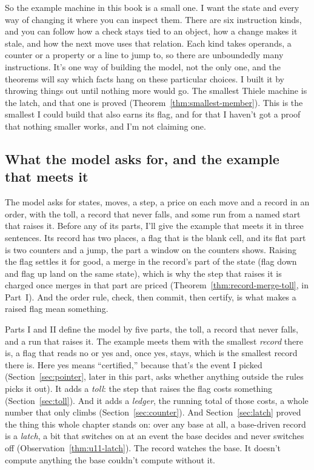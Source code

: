 \documentclass[11pt,twoside]{article}
\theoremstyle{thielethm}
\theoremstyle{thieledef}
\theoremstyle{thieledef}
\theoremstyle{thieledef}
\theoremstyle{thielethm}
\theoremstyle{thieleobs}
\theoremstyle{thielethm}
\begin{document}
So the example machine in this book is a small one. I want the state and every way of
changing it where you can inspect them. There are six instruction kinds, and you can follow how
a check stays tied to an object, how a change makes it stale, and how the next move
uses that relation. Each kind takes operands, a counter or a property or a line to
jump to, so there are unboundedly many instructions. It's one way of building the
model, not the only one, and the theorems will say which facts hang on these particular choices.
I built it by throwing things out until nothing more would go. The smallest Thiele machine is
the latch, and that one is proved (Theorem~\ref{thm:smallest-member}). This is the smallest I could
build that also earns its flag, and for that I haven't got a proof that nothing smaller works, and
I'm not claiming one.

\subsection{What the model asks for, and the example that meets it}

The model asks for states, moves, a step, a price on each move and a record in an order, with the
toll, a record that never falls, and some run from a named start that raises it. Before any of its parts, I'll give the example that meets it in three sentences. Its record has two places, a flag that is the blank cell, and its flat part is two
counters and a jump, the part a window on the counters shows. Raising the flag settles it for good, a merge in the record's part of the state (flag down and flag up land on the
same state), which is why the step that raises it is charged once merges in that part are priced
(Theorem~\ref{thm:record-merge-toll}, in Part~I). And the order rule, check, then commit, then
certify, is what makes a raised flag mean something.

Parts I and II define the model by five parts, the toll, a record that never falls, and a run
that raises it. The example meets them with the smallest \emph{record} there is, a flag that reads
no or yes and, once yes, stays, which is the smallest record there is. Here yes means ``certified,''
because that's the event I picked (Section~\ref{sec:pointer}, later in this part, asks whether anything outside the rules picks it out). It adds a \emph{toll}: the step that raises the flag costs something
(Section~\ref{sec:toll}). And it adds a \emph{ledger}, the running total of those costs, a whole number that only climbs (Section~\ref{sec:counter}).
And Section~\ref{sec:latch} proved the thing this whole chapter stands on: over any base at
all, a base-driven record is a \emph{latch}, a bit that switches on at an event the base decides and
never switches off (Observation~\ref{thm:u11-latch}). The record watches the base. It doesn't
compute anything the base couldn't compute without it.
\end{document}
